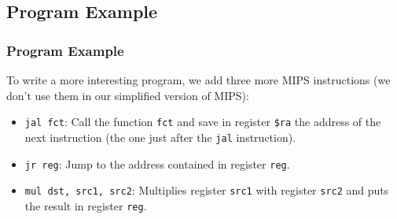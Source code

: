 \documentclass{beamer}
\begin{document}
\subsection{Program Example}

\begin{frame}[fragile]
\frametitle{Program Example}

To write a more interesting program, we add three more MIPS instructions (we don't use them in our simplified
version of MIPS):\\

\vspace{0.4cm}

\begin{itemize}
\item \lstinline{jal fct}: Call the function \lstinline{fct} and save in register \lstinline{$ra} the address of the next instruction (the one just
  after the \lstinline{jal} instruction).
 \vspace{0.2cm}

\item \lstinline{jr reg}: Jump to the address contained in register \lstinline{reg}.
  \vspace{0.2cm}

\item \lstinline{mul dst, src1, src2}: Multiplies register \lstinline{src1} with register \lstinline{src2} and puts the result in register \lstinline{reg}.
\end{itemize}

\end{frame}
\end{document}
